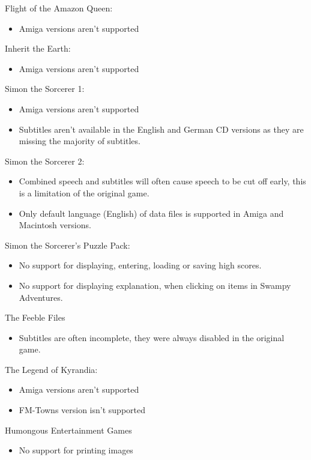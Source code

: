 Flight of the Amazon Queen:
  \begin{itemize}
  \item Amiga versions aren't supported
  \end{itemize}
Inherit the Earth:
  \begin{itemize}
  \item Amiga versions aren't supported
  \end{itemize}
Simon the Sorcerer 1:
  \begin{itemize}
  \item Amiga versions aren't supported
  \item Subtitles aren't available in the English and German CD versions
            as they are missing the majority of subtitles.
  \end{itemize}
Simon the Sorcerer 2:
  \begin{itemize}
  \item Combined speech and subtitles will often cause speech to be
            cut off early, this is a limitation of the original game.
  \item Only default language (English) of data files is supported
            in Amiga and Macintosh versions.
  \end{itemize}
Simon the Sorcerer's Puzzle Pack:
  \begin{itemize}
  \item No support for displaying, entering, loading or saving high scores.
  \item No support for displaying explanation, when clicking on items in
            Swampy Adventures.
  \end{itemize}
The Feeble Files
  \begin{itemize}
  \item Subtitles are often incomplete, they were always disabled in the
            original game.
  \end{itemize}
The Legend of Kyrandia:
  \begin{itemize}
  \item Amiga versions aren't supported
  \item FM-Towns version isn't supported
  \end{itemize}
Humongous Entertainment Games
  \begin{itemize}
  \item No support for printing images
  \end{itemize}


